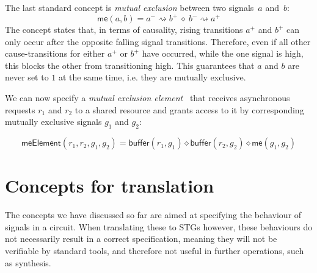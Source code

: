 \documentclass[british,conference,compsoc]{IEEEtran}
\begin{document}
%

The last standard concept is \emph{mutual
exclusion} between two signals~$a$ and~$b$:
\[
\mathsf{me}(a, b) = a^{-}\rightsquigarrow b^{+}\ \diamond\ b^{-}\rightsquigarrow
a^{+}
\]
The concept states that, in terms of causality, rising transitions 
$a^{+}$ and $b^{+}$ can only occur after
the opposite falling signal transitions. Therefore, even if all other cause-transitions for
either $a^{+}$ or $b^{+}$ have occurred, while the one signal is high, this blocks 
the other from transitioning high. This guarantees that $a$ and
$b$ are never set to $1$ at the same time, i.e. they are mutually
exclusive.

We can now specify a \emph{mutual exclusion
element}~\cite{2008_kinniment_synchronisation}
that receives asynchronous requests $r_{1}$ and $r_{2}$ to a shared
resource and grants access to it by corresponding mutually exclusive
signals $g_{1}$ and $g_{2}$:

{\small
\[
\mathsf{meElement}(r_{1}, r_{2}, g_{1}, g_{2})\!=\!\mathsf{buffer}(r_{1}, g_{1})
\diamond \mathsf{buffer}(r_{2}, g_{2}) \diamond \mathsf{me}(g_{1}, g_{2})
\]}


\section{Concepts for translation\label{sec:trans-concepts}}

The concepts we have discussed so far are aimed at specifying the behaviour of signals in a circuit.
When translating these to STGs however, these behaviours do not necessarily result in a correct
specification, meaning they will not be verifiable by standard tools, and therefore not useful in 
further operations, such as synthesis.
\end{document}
